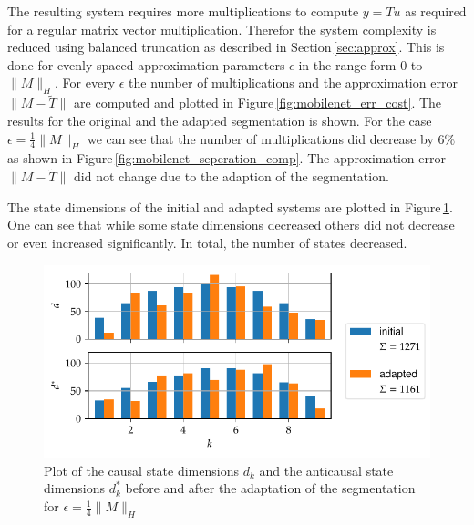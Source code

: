 \documentclass[doctype=mastersthesis,BCOR=15mm,biblatex]{ldvbook}%
\begin{document}
The resulting system requires more multiplications to compute $y=Tu$ as required for a regular matrix vector multiplication.
Therefor the system complexity is reduced using balanced truncation as described in Section\,\ref{sec:approx}.
This is done for evenly spaced approximation parameters $\epsilon$ in the range form 0 to $\|M\|_H$.
For every $\epsilon$ the number of multiplications and the approximation error $\| M-\tilde{T} \|$ are computed and plotted in Figure\,\ref{fig:mobilenet_err_cost}.
The results for the original and the adapted segmentation is shown.
For the case $\epsilon = \frac{1}{4} \|M\|_H$ we can see that the number of multiplications 
did decrease by $6\%$ as shown in Figure\,\ref{fig:mobilenet_seperation_comp}.
The approximation error $\| M-\tilde{T} \|$ did not change due to the adaption of the segmentation.

The state dimensions of the initial and adapted systems are plotted in Figure\,\ref{fig:mobilenet_state_dims_move}.
One can see that while some state dimensions decreased others did not decrease or even increased significantly.
In total, the number of states decreased.
\begin{figure}[!htb]
	\centering
	\includegraphics[width=\textwidth]{Plots/move_example_mobilenet_state_dims.pdf}
	\caption{Plot of the causal state dimensions $d_k$ and the anticausal state dimensions $d_k^*$ before and after the adaptation of the segmentation for $\epsilon = \frac{1}{4} \|M\|_H$
	}
	\label{fig:mobilenet_state_dims_move}
\end{figure}
\end{document}
